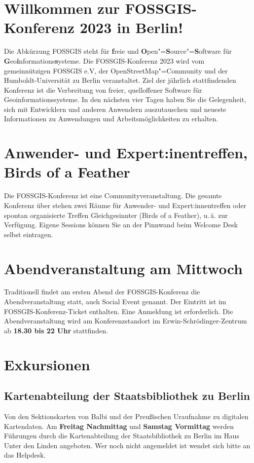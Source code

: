 \newpage
\section*{Willkommen zur FOSSGIS-Konferenz 2023 in Berlin!}\label{welcome}
Die Abkürzung { FOSSGIS} steht für {\bfseries f}reie und {\bfseries O}pen"={\bfseries S}ource"={\bfseries S}oftware für {\bfseries G}eo{\bfseries i}nformations{\bfseries s}ysteme.
Die FOSSGIS-Konferenz 2023 wird vom gemeinnützigen FOSSGIS e.V, der
OpenStreetMap"=Community und der Humboldt-Universität zu Berlin
veranstaltet.
Ziel der jährlich stattfindenden Konferenz ist die Verbreitung von freier,
quelloffener Software für Geoinformationssysteme. In den nächsten vier Tagen
haben Sie die Gelegenheit, sich mit Entwicklern und anderen Anwendern
auszutauschen und \mbox{neueste} Informationen zu Anwendungen und
Arbeitsmöglichkeiten zu erhalten.

\section*{Anwender- und Expert:inentreffen, Birds of a Feather}
Die FOSSGIS-Konferenz ist eine Communityveranstaltung.
Die gesamte Konferenz über stehen zwei Räume für Anwender- und Expert:innentreffen oder spontan organisierte
Treffen Gleichgesinnter (Birds of a Feather), u.\,ä.
zur Verfügung. Eigene Sessions können Sie an der Pinnwand beim
Welcome Desk selbst eintragen.

\section*{Abendveranstaltung am Mittwoch}\label{schwaetzli}
Traditionell findet am ersten Abend der FOSSGIS-Konferenz die
Abendveranstaltung statt, auch Social Event genannt. Der Eintritt
ist im FOSSGIS-Konferenz-Ticket enthalten. Eine Anmeldung ist erforderlich.
Die Abendveranstaltung wird am Konferenzstandort im Erwin-Schrödinger-Zentrum
ab {\bfseries 18.30 bis 22 Uhr} stattfinden.

\section*{Exkursionen}
\subsection*{Kartenabteilung der Staatsbibliothek zu Berlin}
Von den Sektionskarten von Balbi und der Preußischen Uraufnahme zu digitalen Kartendaten.
Am {\bfseries Freitag Nachmittag} und {\bfseries Samstag Vormittag} werden Führungen durch die Karten\-abteilung der Staatsbibliothek zu Berlin im Haus Unter den Linden angeboten. Wer noch nicht angemeldet ist wendet sich bitte an das Helpdesk.
\pagebreak

